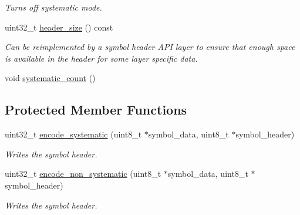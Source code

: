 \begin{DoxyCompactItemize}
\begin{DoxyCompactList}\small\item\em Turns off systematic mode. \end{DoxyCompactList}\item 
uint32\-\_\-t \hyperlink{classkodo_1_1base__systematic__encoder_a0423a5f6f8cf070ea669c2419ce69898}{header\-\_\-size} () const 
\begin{DoxyCompactList}\small\item\em Can be reimplemented by a symbol header A\-P\-I layer to ensure that enough space is available in the header for some layer specific data. \end{DoxyCompactList}\item 
void \hyperlink{classkodo_1_1base__systematic__encoder_a5769a068f98f848e4fa54ae79072f779}{systematic\-\_\-count} ()
\end{DoxyCompactItemize}
\subsection*{Protected Member Functions}
\begin{DoxyCompactItemize}
\item 
uint32\-\_\-t \hyperlink{classkodo_1_1base__systematic__encoder_ad17e2fa5ddc45e7678d0fad11ab75a0e}{encode\-\_\-systematic} (uint8\-\_\-t $\ast$symbol\-\_\-data, uint8\-\_\-t $\ast$symbol\-\_\-header)
\begin{DoxyCompactList}\small\item\em Writes the symbol header. \end{DoxyCompactList}\item 
uint32\-\_\-t \hyperlink{classkodo_1_1base__systematic__encoder_a4c00c989bce590e4ee11308f96a1bb92}{encode\-\_\-non\-\_\-systematic} (uint8\-\_\-t $\ast$symbol\-\_\-data, uint8\-\_\-t $\ast$symbol\-\_\-header)
\begin{DoxyCompactList}\small\item\em Writes the symbol header. \end{DoxyCompactList}\end{DoxyCompactItemize}
